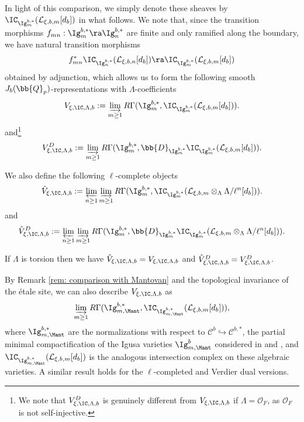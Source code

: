 \documentclass[letterpaper,11pt]{amsart}
\begin{document}
In light of this comparison, we simply denote these sheaves by $\IC_{\Ig^{b,*}_{m}}(\mathcal{L}_{\xi,b,m}[d_b])$ in what follows. We note that, since the transition morphisms $f_{mn}: \Ig^{b,*}_{m} \ra \Ig^{b,*}_{n}$ are finite and only ramified along the boundary, we have natural transition morphisms 
\[ f_{mn}^{*}\IC_{\Ig^{b,*}_{n}}(\mathcal{L}_{\xi,b,n}[d_{b}]) \ra \IC_{\Ig^{b,*}_{m}}(\mathcal{L}_{\xi,b,m}[d_{b}]) \]
obtained by adjunction, which allows us to form the following smooth $J_{b}(\bb{Q}_{p})$-representations with $\Lambda$-coefficients
\begin{equation}{\label{eqn: defofIC}}
V_{\xi,\IC,\Lambda,b} := \varinjlim_{m \geq 1} R\Gamma(\Ig^{b,*}_{m},\IC_{\Ig^{b,*}_{m}}(\mathcal{L}_{\xi,b,m}[d_{b}])).   
\end{equation}
and\footnote{We note that $V_{\xi,\IC,\Lambda,b}^{D}$ is genuinely different from $V_{\xi,\IC,\Lambda,b}$ if $\Lambda = \mathcal{O}_{F}$, as $\mathcal{O}_{F}$ is not self-injective.} 
\begin{equation}{\label{eqn: defofICdual}}
V_{\xi,\IC,\Lambda,b}^{D} := \varinjlim_{m \geq 1} R\Gamma(\Ig^{b,*}_{m},\bb{D}_{\Ig^{b,*}_{m}}\IC_{\Ig^{b,*}_{m}}(\mathcal{L}_{\xi,b,m}[d_{b}])).   
\end{equation}

We also define the following $\ell$-complete objects
\begin{equation}{\label{eqn: defofICcomplete}}
\hat{V}_{\xi,\IC,\Lambda,b} := \varprojlim_{n \geq 1} \varinjlim_{m \geq 1} R\Gamma(\Ig^{b,*}_{m},\IC_{\Ig^{b,*}_{m}}(\mathcal{L}_{\xi,b,m} \otimes_{\Lambda} \Lambda/\ell^{n}[d_{b}])).  
\end{equation}
and
\begin{equation}{\label{eqn: defofICcompletedual}}
\hat{V}_{\xi,\IC,\Lambda,b}^{D} := \varprojlim_{n \geq 1} \varinjlim_{m \geq 1} R\Gamma(\Ig^{b,*}_{m},\bb{D}_{\Ig^{b,*}_{m}}\IC_{\Ig^{b,*}_{m}}(\mathcal{L}_{\xi,b,m} \otimes_{\Lambda} \Lambda/\ell^{n}[d_{b}])).  
\end{equation}

If $\Lambda$ is torsion then we have $\hat{V}_{\xi,\IC,\Lambda,b} = V_{\xi,\IC,\Lambda,b}$ and $\hat{V}^{D}_{\xi,\IC,\Lambda,b} = V^{D}_{\xi,\IC,\Lambda,b}$. 
\begin{remark}
By Remark \ref{rem: comparison with Mantovan} and the topological invariance of the \'etale site, we can also describe $V_{\xi,\IC,\Lambda,b}$ as
\[ \varinjlim_{m \geq 1} R\Gamma(\Ig^{b,*}_{m,\Mant},\IC_{\Ig^{b,*}_{m,\Mant}}(\mathcal{L}_{\xi,b,m}[d_{b}])), \]
where $\Ig^{b,*}_{m,\Mant}$ are the normalizations with respect to $\mathscr{C}^{b} \hookrightarrow \mathscr{C}^{b,*}$, the partial minimal compactification of the Igusa varieties $\Ig^{b}_{m,\Mant}$ considered in \cite{CS17} and \cite{mantovan-PEL}, and $\IC_{\Ig^{b,*}_{m,\Mant}}(\mathcal{L}_{\xi,b,m}[d_{b}])$ is the analogous intersection complex on these algebraic varieties. A similar result holds for the $\ell$-completed and Verdier dual versions.
\end{remark}
\end{document}
